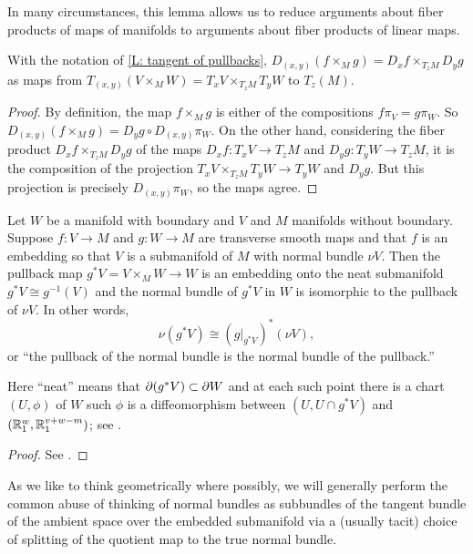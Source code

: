 In many circumstances, this lemma allows us to reduce arguments about fiber products of maps of manifolds to arguments about fiber products of linear maps.

\begin{corollary}\label{C: tangent map of pullbacks}
With the notation of \cref{L: tangent of pullbacks}, $D_{(x,y)}(f \times_M g)=D_xf \times_{T_zM} D_yg$ as maps from $T_{(x,y)}(V \times_M W) = T_xV \times_{T_zM} T_yW$ to $T_z(M)$.
\end{corollary}

\begin{proof}
	By definition, the map $f \times_M g$ is either of the compositions $f \pi_V = g \pi_W$. So $D_{(x,y)} (f \times_M g) = D_yg \circ D_{(x,y)} \pi_W$. On the other hand, considering the fiber product $D_xf \times_{T_z M} D_y g$ of the maps $D_x f \colon T_xV \to T_zM$ and $D_y g \colon T_yW \to T_zM$, it is the composition of the projection $T_xV \times_{T_zM} T_yW \to T_yW$ and $D_y g$.
	But this projection is precisely $D_{(x,y)} \pi_W$, so the maps agree.
\end{proof}

\begin{lemma}\label{L: normal pullback}
	Let $W$ be a manifold with boundary and $V$ and $M$ manifolds without boundary. Suppose $f \colon V \to M$ and $g \colon W \to M$ are transverse smooth maps and that $f$ is an embedding so that $V$ is a submanifold of $M$ with normal bundle $\nu V$.
	Then the pullback map $g^*V = V \times_MW \to W$ is an embedding onto the neat submanifold $g^*V \cong g^{-1}(V)$ and the normal bundle of $g^*V$ in $W$ is isomorphic to the pullback of $\nu V$.
	In other words,
	$$\nu(g^*V) \cong \left(g|_{g^*V}\right)^*(\nu V),$$
	or ``the pullback of the normal bundle is the normal bundle of the pullback.''
\end{lemma}

Here ``neat'' means that $\partial (g^*V) \subset \partial W$ and at each such point there is a chart $(U,\phi)$ of $W$ such $\phi$ is a diffeomorphism between $(U, U\cap g^*V)$ and $(\mathbb{R}^w_1, \mathbb{R}^{v+w-m}_1)$; see \cite[Definition II.2.2]{Kos93}.

\begin{proof}
	See \cite[Proposition IV.1.4]{Kos93}.
\end{proof}

As we like to think geometrically where possibly, we will generally perform the common abuse of thinking of normal bundles as subbundles of the tangent bundle of the ambient space over the embedded submanifold via a (usually tacit) choice of splitting of the quotient map to the true normal bundle.

